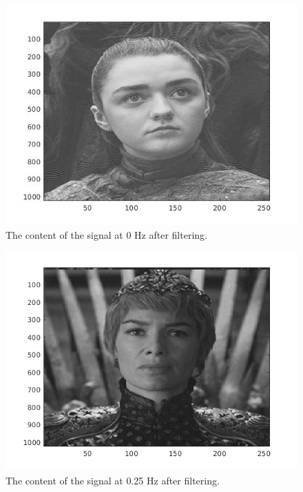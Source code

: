 \documentclass[a4paper,twocolumn]{article}
\begin{document}
\begin{figure}[H]
  \begin{center}
    \includegraphics[width=0.9\columnwidth]{pic_recived.jpg}
  \end{center}
  \caption{The content of the signal at 0 Hz after filtering.}
  \label{fig:arya}
\end{figure}

\begin{figure}[H]
  \begin{center}
    \includegraphics[width=0.9\columnwidth]{ceseiri.png}
  \end{center}
  \caption{The content of the signal at 0.25 Hz after filtering.}
  \label{fig:cersi}
\end{figure}
\end{document}

